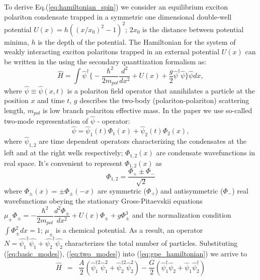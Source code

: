 \documentclass[aps, pre, preprint, groupedaddress, superscriptaddress, showkeys, showpacs] {revtex4-1}
\begin{document}
{{{To derive Eq.(\ref{eq:hamiltonian_spin}) we consider an equilibrium exciton polariton condensate trapped in a symmetric one dimensional double-well potential $U(x) = h ((x/x_0)^2 - 1)^2$; $2x_0$ is the distance between potential minima, $h$ is the depth of the potential.
The Hamiltonian for the system of weakly interacting exciton polaritons trapped in an external potential $U(x)$ can be written in the using the secondary quanttization formalism as:
%
\begin{equation}
\hat{H} = \int \hat{\psi}^\dag\Big\{ -\dfrac{\hbar^2}{2m_{pol}}  \dfrac{d^2 }{dx^2} + U(x) + \dfrac{g}{2} \hat{\psi}^{\dag} \hat{\psi}  \Big\}\hat{\psi} dx,
\label{eq:gpe_hamiltonian}
\end{equation}
%
where $\hat{\psi} \equiv \hat{\psi}(x, t)$ is a polariton field operator that annihilates a particle at the position $x$ and time $t$, $g$ describes the two-body (polariton-polariton) scattering length, $m_{pol}$ is low branch polariton effective mass.
In the paper we use so-called two-mode representation of $\hat{\psi}$ - operator:
%
\begin{equation}
\hat{\psi} = \hat{\psi}_1(t) \Phi_1(x) + \hat{\psi}_2(t) \Phi_2(x),
\label{eq:two_modes}
\end{equation}
%
where $\hat{\psi}_{1,2}$ are time dependent operators characterizing the condensates at the left and at the right wells respectively; $\Phi_{1,2}(x)$ are condensate wavefunctions in real space.
It's convenient to represent $\Phi_{1,2}(x)$ as
%
\begin{equation}
\Phi_{1,2} = \dfrac{\Phi_+ \pm \Phi_-}{\sqrt{2}}
\label{eq:basic_modes}
\end{equation}
%
where $\Phi_{\pm}(x) = \pm \Phi_{\pm}(-x)$ are symmetric ($\Phi_+$) and antisymmetric ($\Phi_-$) real wavefunctions obeying the stationary Gross-Pitaevskii equations $\mu_{\pm} \Phi_{\pm} = -\dfrac{\hbar^2}{2m_{pol}} \dfrac{d^2 \Phi_{\pm}}{dx^2} + U(x) \Phi_{\pm} + g \Phi_{\pm}^3$
and the normalization condition $\int \Phi_{\pm}^2 dx = 1$; $\mu_{\pm}$ is a chemical potential.
As a result, an operator $N=\hat{\psi_1}^\dag\hat{\psi_1} + \hat{\psi_2}^\dag\hat{\psi_2}$ characterizes the total number of particles.
Substituting (\ref{eq:basic_modes}), (\ref{eq:two_modes}) into (\ref{eq:gpe_hamiltonian}) we arrive to
% 
\begin{equation}
\begin{array}{lcl}
\hat{H} & = & \dfrac{A}{2} (\hat{\psi}_1^{\dag 2} \hat{\psi}_1^2 + \hat{\psi}_2^{\dag 2} \hat{\psi}_2^2) - \dfrac{G}{2} (\hat{\psi}_1^\dag \hat{\psi}_2 + \hat{\psi}_1 \hat{\psi}_2^\dag) \\ [8pt]

\end{array}
\end{equation}}}}
\end{document}
